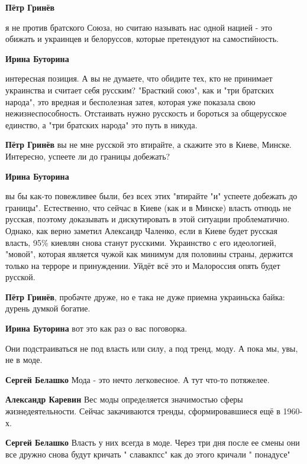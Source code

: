 \begin{itemize}
\begin{itemize} %
\textbf{Пётр Гринёв} 

я не против братского Союза, но считаю называть нас одной нацией - это обижать
и украинцев и белоруссов, которые претендуют на самостийность.


\textbf{Ирина Буторина} 

интересная позиция. А вы не думаете, что обидите тех, кто не принимает украинства
и считает себя русским? "Брасткий союз", как и "три братских народа", это вредная и
бесполезная затея, которая уже показала свою нежизнеспособность. Отстаивать нужно
русскость и бороться за общерусское единство, а "три братских народа" это путь в
никуда.

\textbf{Пётр Гринёв} вы не мне русской это втирайте, а скажите это в Киеве, Минске. Интересно, успеете ли до границы добежать?

\textbf{Ирина Буторина} 

вы бы как-то повежливее были, без всех этих "втирайте "и" успеете добежать до
границы". Естественно, что сейчас в Киеве (как и в Минске) власть отнюдь не
русская, поэтому доказывать и дискутировать в этой ситуации
проблематично. Однако, как верно заметил Александр Чаленко, если в Киеве будет
русская власть, 95\% киевлян снова станут русскими. Украинство с его
идеологией, "мовой", которая является чужой как минимум для половины
страны, держится только на терроре и принуждении. Уйдёт всё это и Малороссия
опять будет русской.

\textbf{Пётр Гринёв}, пробачте друже, но е така не дуже приемна украиньска байка: дурень думкой богатие.

\textbf{Ирина Буторина} вот это как раз о вас поговорка.
\end{itemize} %

Они подстраиваться не под власть или силу, а под тренд, моду. А пока мы, увы, не в моде.

\begin{itemize} %
\textbf{Сергей Белашко} Мода - это нечто легковесное. А тут что-то потяжелее.

\textbf{Александр Каревин} Вес моды определяется значимостью сферы жизнедеятельности. Сейчас закачиваются тренды, сформировавшиеся ещё в 1960-х.

\textbf{Сергей Белашко} Власть у них всегда в моде. Через три дня после ее смены они все дружно снова будут кричать " славакпсс" как до этого кричали " понадусе"
\end{itemize} %


\end{itemize}
